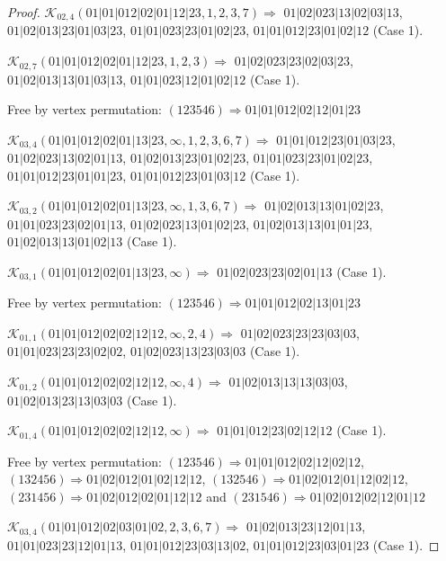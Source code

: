 \documentclass[12pt]{article}
\theoremstyle{plain}
\theoremstyle{definition}
\theoremstyle{remark}
\newcommand{\fancy}[1]{\mathcal{#1}}
\def\K{\fancy{K}}
\begin{document}
\begin{proof}
	
	
	\bigskip
	
	$\K_{02,4}(01|01|012|02|01|12|23,1, 2, 3, 7)\Rightarrow $ $01|02|023|13|02|03|13$, $01|02|013|23|01|03|23$, $01|01|023|23|01|02|23$, $01|01|012|23|01|02|12$ (Case 1).
	
	$\K_{02,7}(01|01|012|02|01|12|23,1, 2, 3)\Rightarrow $ $01|02|023|23|02|03|23$, $01|02|013|13|01|03|13$, $01|01|023|12|01|02|12$ (Case 1).
	
	
	
	Free by vertex permutation: $(1 2 3 5 4 6)\Rightarrow 01|01|012|02|12|01|23$
	
	
	
	\bigskip
	
	$\K_{03,4}(01|01|012|02|01|13|23,\infty,1, 2, 3, 6, 7)\Rightarrow $ $01|01|012|23|01|03|23$, $01|02|023|13|02|01|13$, $01|02|013|23|01|02|23$, $01|01|023|23|01|02|23$, $01|01|012|23|01|01|23$, $01|01|012|23|01|03|12$ (Case 1).
	
	$\K_{03,2}(01|01|012|02|01|13|23,\infty,1, 3, 6, 7)\Rightarrow $ $01|02|013|13|01|02|23$, $01|01|023|23|02|01|13$, $01|02|023|13|01|02|23$, $01|02|013|13|01|01|23$, $01|02|013|13|01|02|13$ (Case 1).
	
	$\K_{03,1}(01|01|012|02|01|13|23,\infty)\Rightarrow $ $01|02|023|23|02|01|13$ (Case 1).
	
	
	
	Free by vertex permutation: $(1 2 3 5 4 6)\Rightarrow 01|01|012|02|13|01|23$
	
	
	
	\bigskip
	
	$\K_{01,1}(01|01|012|02|02|12|12,\infty,2, 4)\Rightarrow $ $01|02|023|23|23|03|03$, $01|01|023|23|23|02|02$, $01|02|023|13|23|03|03$ (Case 1).
	
	$\K_{01,2}(01|01|012|02|02|12|12,\infty,4)\Rightarrow $ $01|02|013|13|13|03|03$, $01|02|013|23|13|03|03$ (Case 1).
	
	$\K_{01,4}(01|01|012|02|02|12|12,\infty)\Rightarrow $ $01|01|012|23|02|12|12$ (Case 1).
	
	
	
	Free by vertex permutation: $(1 2 3 5 4 6)\Rightarrow 01|01|012|02|12|02|12$, $(1 3 2 4 5 6)\Rightarrow 01|02|012|01|02|12|12$, $(1 3 2 5 4 6)\Rightarrow 01|02|012|01|12|02|12$, $(2 3 1 4 5 6)\Rightarrow 01|02|012|02|01|12|12$ and $(2 3 1 5 4 6)\Rightarrow 01|02|012|02|12|01|12$
	
	
	
	\bigskip
	
	$\K_{03,4}(01|01|012|02|03|01|02,2, 3, 6, 7)\Rightarrow $ $01|02|013|23|12|01|13$, $01|01|023|23|12|01|13$, $01|01|012|23|03|13|02$, $01|01|012|23|03|01|23$ (Case 1).
	

\end{proof}
\end{document}
